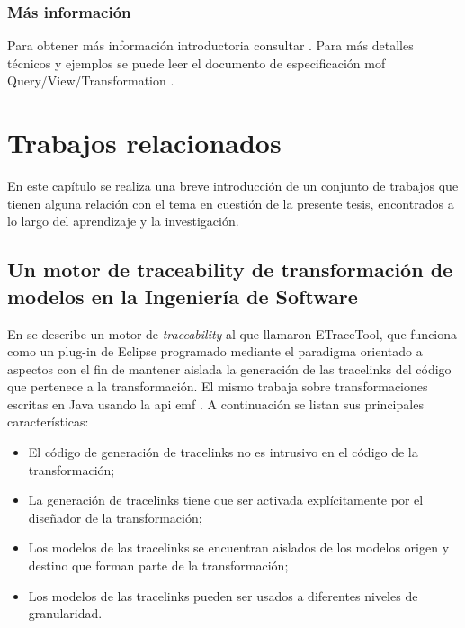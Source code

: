 \documentclass[a4paper,12pt,oneside,spanish]{book}
\begin{document}
\subsection{Más información}

Para obtener más información introductoria consultar \cite{DSDPM}. Para más detalles técnicos y ejemplos se puede leer el documento de especificación \gls{mof} Query/View/Transformation \cite{QVT}.




\chapter{Trabajos relacionados}

En este capítulo se realiza una breve introducción de un conjunto de trabajos que tienen alguna relación con el tema en cuestión de la presente tesis, encontrados a lo largo del aprendizaje y la investigación.

\section{Un motor de traceability de transformación de modelos en la Ingeniería de Software}

En \cite{AmarLeblancCoulette} se describe un motor de \textit{traceability} al que llamaron ETraceTool, que funciona como un plug-in de Eclipse programado mediante el paradigma orientado a aspectos con el fin de mantener aislada la generación de las tracelinks del código que pertenece a la transformación. El mismo trabaja sobre transformaciones escritas en Java usando la \gls{api} \gls{emf} \cite{EMF}. A continuación se listan sus principales características:

\begin{itemize}
\item El código de generación de tracelinks no es intrusivo en el código de la transformación;
\item La generación de tracelinks tiene que ser activada explícitamente por el diseñador de la transformación;
\item Los modelos de las tracelinks se encuentran aislados de los modelos origen y destino que forman parte de la transformación;
\item Los modelos de las tracelinks pueden ser usados a diferentes niveles de granularidad.
\end{itemize}
\end{document}
